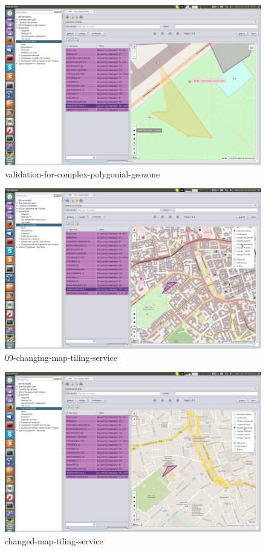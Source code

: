 \begin{figure}[!htp]
\centering
\includegraphics[width=16cm]{chapters/01-geozones/images/08-validation-for-complex-polygonial-geozone.png}
\caption{validation-for-complex-polygonial-geozone}\label{fig:08}
\end{figure}

\begin{figure}[!htp]
\centering
\includegraphics[width=16cm]{chapters/01-geozones/images/09-changing-map-tiling-service.png}
\caption{09-changing-map-tiling-service}\label{fig:09}
\end{figure}

\begin{figure}[!htp]
\centering
\includegraphics[width=16cm]{chapters/01-geozones/images/10-changed-map-tiling-service.png}
\caption{changed-map-tiling-service}\label{fig:10}
\end{figure}